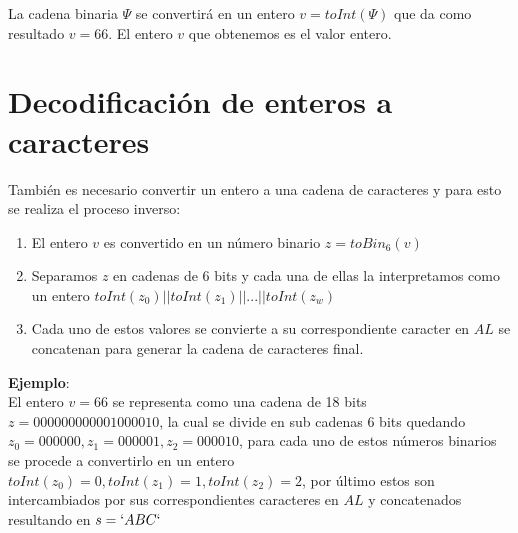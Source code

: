 \documentclass[12pt,oneside,onecolumn,openany]{report}
\begin{document}
La cadena binaria $\Psi$ se convertirá en un entero $v=toInt(\Psi )$ que da como resultado $v=66$. El entero $v$ que obtenemos es el valor entero.

\section{Decodificación de enteros a caracteres}

También es necesario convertir un entero a una cadena de caracteres y para esto se realiza el proceso inverso:
\begin{enumerate}
 \item El entero $v$ es convertido en un número binario  $z=toBin_6(v)$ 
 \item Separamos $z$ en cadenas de 6 bits y cada una de ellas la interpretamos como un entero $toInt(z_0)||toInt(z_1)||...||toInt(z_w)$
 \item Cada uno de estos valores se convierte a su correspondiente caracter en $AL$ se concatenan para generar la cadena de caracteres final.
\end{enumerate}
\textbf{Ejemplo}:\\
El entero $v=66$ se representa como una cadena de 18 bits $z=000000000001000010$, la cual se divide en sub cadenas 6 bits quedando $z_0=000000, z_1=000001, z_2=000010$, para cada uno de estos números binarios se procede a convertirlo en un entero $toInt(z_0)=0, toInt(z_1)=1, toInt(z_2)=2$, por último estos son intercambiados por sus correspondientes caracteres en $AL$ y concatenados resultando en $s=`ABC`$
\end{document}
